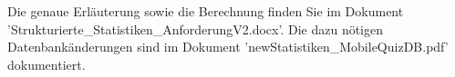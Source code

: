 Die genaue Erläuterung sowie die Berechnung finden Sie im Dokument \\ 'Strukturierte\_Statistiken\_AnforderungV2.docx'. Die dazu nötigen Datenbankänderungen sind im Dokument 'newStatistiken\_MobileQuizDB.pdf' dokumentiert.
















